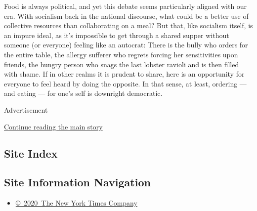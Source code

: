 Food is always political, and yet this debate seems particularly aligned
with our era. With socialism back in the national discourse, what could
be a better use of collective resources than collaborating on a meal?
But that, like socialism itself, is an impure ideal, as it's impossible
to get through a shared supper without someone (or everyone) feeling
like an autocrat: There is the bully who orders for the entire table,
the allergy sufferer who regrets forcing her sensitivities upon friends,
the hungry person who snags the last lobster ravioli and is then filled
with shame. If in other realms it is prudent to share, here is an
opportunity for everyone to feel heard by doing the opposite. In that
sense, at least, ordering --- and eating --- for one's self is downright
democratic.

Advertisement

\protect\hyperlink{after-bottom}{Continue reading the main story}

\hypertarget{site-index}{%
\subsection{Site Index}\label{site-index}}

\hypertarget{site-information-navigation}{%
\subsection{Site Information
Navigation}\label{site-information-navigation}}

\begin{itemize}
\tightlist
\item
  \href{https://help.nytimes3xbfgragh.onion/hc/en-us/articles/115014792127-Copyright-notice}{©~2020~The
  New York Times Company}
\end{itemize}

